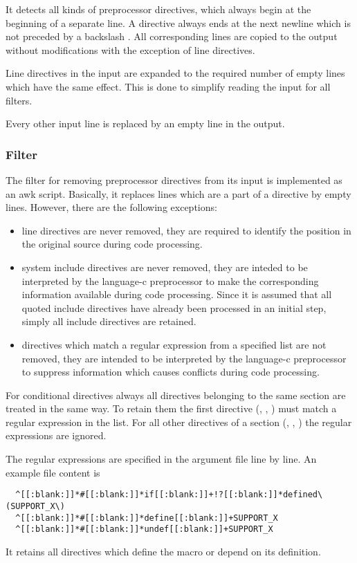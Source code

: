 It detects all kinds of preprocessor directives, which always begin at the beginning of a separate line.
A directive always ends at the next newline which is not preceded by a backslash \code{\\}. All corresponding
lines are copied to the output without modifications with the exception of line directives.

Line directives in the input are expanded to the required number of empty lines
which have the same effect. This is done to simplify reading the input for all  filters.

Every other input line is replaced by an empty line in the output.

\subsubsection{Filter }

The filter for removing preprocessor directives from its input is implemented as an awk script.
Basically, it replaces lines which are a part of a directive by empty lines. However, there are the following
exceptions:
\begin{itemize}
\item line directives are never removed, they are required to identify the position in the original source
during code processing.
\item system include directives are never removed, they are inteded to be interpreted by the language-c
preprocessor to make the corresponding information available during code processing. Since it is assumed that
all quoted include directives have already been processed in an initial step, simply all include
directives are retained.
\item directives which match a regular expression from a specified list are not removed, they are intended
to be interpreted by the language-c preprocessor to suppress information which causes conflicts during code
processing.
\end{itemize}

For conditional directives always all directives belonging to the same section are treated in the same way.
To retain them the first directive (, , ) must match a regular expression
in the list. For all other directives of a section (, , ) the 
regular expressions are ignored.

The regular expressions are specified in the argument file line by line. An example file content is
\begin{verbatim}
  ^[[:blank:]]*#[[:blank:]]*if[[:blank:]]+!?[[:blank:]]*defined\(SUPPORT_X\)
  ^[[:blank:]]*#[[:blank:]]*define[[:blank:]]+SUPPORT_X
  ^[[:blank:]]*#[[:blank:]]*undef[[:blank:]]+SUPPORT_X
\end{verbatim}
It retains all directives which define the macro  or depend on its definition.

